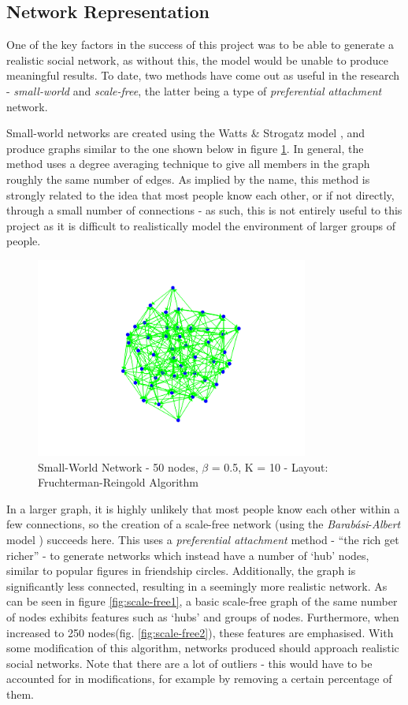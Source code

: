 \documentclass[]{article}
\begin{document}
\subsection{Network Representation}
One of the key factors in the success of this project was to be able to generate a realistic social network, as without this, the model would be unable to produce meaningful results. To date, two methods have come out as useful in the research - \emph{small-world} and \emph{scale-free}, the latter being a type of \emph{preferential attachment} network.

Small-world networks are created using the Watts \& Strogatz model \cite{WSTech}, and produce graphs similar to the one shown below in figure \ref{fig:small-world}. In general, the method uses a degree averaging technique to give all members in the graph roughly the same number of edges. As implied by the name, this method is strongly related to the idea that most people know each other, or if not directly, through a small number of connections - as such, this is not entirely useful to this project as it is difficult to realistically model the environment of larger groups of people. 

\begin{figure}
	\centering
		\includegraphics[width=0.80\textwidth]{small-world.png}
	\caption{Small-World Network - 50 nodes, $\beta$ = 0.5, K = 10 - Layout: Fruchterman-Reingold Algorithm}
	\label{fig:small-world}
\end{figure}


In a larger graph, it is highly unlikely that most people know each other within a few connections, so the creation of a scale-free network (using the \emph{Barab\'{a}si}-\emph{Albert} model \cite{BAMod}) succeeds here. This uses a \emph{preferential attachment} method - ``the rich get richer'' - to generate networks which instead have a number of `hub' nodes, similar to popular figures in friendship circles. Additionally, the graph is significantly less connected, resulting in a seemingly more realistic network. As can be seen in figure \ref{fig:scale-free1}, a basic scale-free graph of the same number of nodes exhibits features such as `hubs' and groups of nodes. Furthermore, when increased to 250 nodes(fig. \ref{fig:scale-free2}), these features are emphasised. With some modification of this algorithm, networks produced should approach realistic social networks. Note that there are a lot of outliers - this would have to be accounted for in modifications, for example by removing a certain percentage of them.
\end{document}
